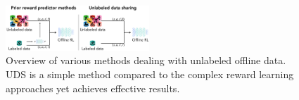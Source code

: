 \documentclass[../thesis.tex]{subfiles}
\begin{document}
\begin{figure}[ht]
    \centering
    \includegraphics[width=0.48\textwidth]{chapters/uds/teaser_new.png}
    \vspace{-0.2cm}
    \caption{\footnotesize  Overview of various methods dealing with unlabeled offline data. UDS is a simple method compared to the complex reward learning approaches yet achieves effective results.}
    \vspace{-0.4cm}
    \label{fig:uds_teaser}
\end{figure}


    
\end{document}
